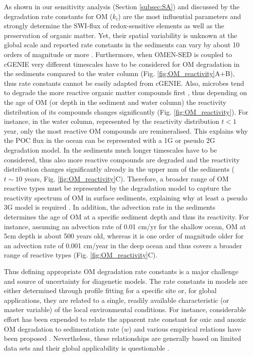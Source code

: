 \documentclass[gmd, manuscript]{copernicus}
\begin{document}
As shown in our sensitivity analysis (Section \ref{subsec:SA}) and discussed by \citet{arndt_quantifying_2013} the 
degradation rate constants for OM ($k_i$) are the most influential parameters and strongly determine the SWI-flux of redox-sensitive elements as well as the preservation of organic matter. 
Yet, their spatial variability is unknown at the global scale and reported rate constants in the sediments can vary by about 10 orders of magnitude or more \citep{middelburg_organic_1993, arndt_quantifying_2013}. 
Furthermore, when OMEN-SED is coupled to cGENIE very different timescales have to be considered for OM degradation in the sediments compared to the water column (Fig. \ref{fig:OM_reactivity}A+B), 
thus rate constants cannot be easily adapted from cGENIE. 
Also, microbes tend to degrade the more reactive organic matter compounds first \citep{emerson_processes_1988, wakeham_compositions_1997, lee_composition_2000}, thus depending on the age of OM (or depth in the sediment and water column) the 
reactivity distribution of its compounds changes significantly (Fig. \ref{fig:OM_reactivity}). 
For instance, in the water column, represented by the reactivity distribution $t<1$ year, only the most reactive OM compounds are 
remineralised. This explains why the POC flux in the ocean can be represented with a 1G or pseudo 2G degradation model. In the sediments much longer timescales have to be considered, 
thus also more reactive compounds are degraded and the reactivity distribution changes significantly already in the upper mm of the sediments ($t \sim 10$ years, Fig. \ref{fig:OM_reactivity}C). 
Therefore, a broader range of OM reactive types must be represented by the degradation model to capture the reactivity spectrum of OM in surface sediments, explaining why at least a pseudo 3G model is required 
\citep[including two degradable and one refractory fraction][]{soetaert_model_1996, boudreau1997diagenetic, stolpovsky_toward_2015}. 
In addition, the advection rate in the sediments determines the age of OM at a specific sediment depth and thus its reactivity. 
For instance, assuming an advection rate of 0.01 cm/yr for the shallow ocean, OM at 5cm depth is about 500 years old, whereas it is one order of magnitude older for an advection rate of 0.001 cm/year in the deep ocean 
and thus covers a broader range of reactive types (Fig. \ref{fig:OM_reactivity}C).  


Thus defining appropriate OM degradation rate constants is a major challenge and source of uncertainty for diagenetic models. The rate constants in models are either determined through profile fitting for a specific site or, 
for global applications, they are related to a single, readily available characteristic (or master variable) of the local environmental conditions. 
For instance, considerable effort has been expended to relate the apparent rate constant for oxic and 
anoxic OM degradation to sedimentation rate ($w$) and various empirical relations have been proposed \citep{toth_organic_1977, tromp_global_1995, boudreau1997diagenetic, stolpovsky_toward_2015}. 
Nevertheless, these relationships are generally based on limited data sets and their global applicability is questionable \citep{arndt_quantifying_2013}. 
\end{document}
